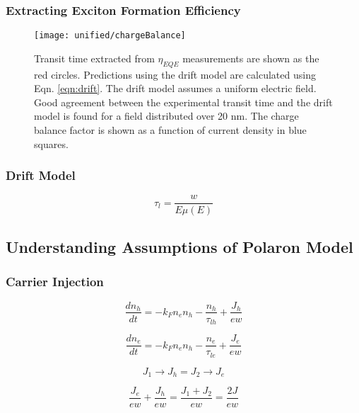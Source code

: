 \documentclass[../thesis.tex]{subfiles}
\begin{document}
\subsubsection{Extracting Exciton Formation Efficiency}
\begin{figure}[ht]
\centering
\texttt{[image: unified/chargeBalance]}
\caption{Transit time extracted from $\eta_{EQE}$ measurements are shown as the red circles. Predictions using the drift model are calculated using Eqn. \ref{eqn:drift}. The drift model assumes a uniform electric field. Good agreement between the experimental transit time and the drift model is found for a field distributed over 20 nm. The charge balance factor is shown as a function of current density in blue squares.}
\label{fig:chargeBalance}
\end{figure}
\subsubsection{Drift Model}

\begin{equation}
\tau_l=\frac{w}{E\mu(E)}
\label{eqn:drift}
\end{equation}


\subsection{Understanding Assumptions of Polaron Model}
\subsubsection{Carrier Injection}

\begin{equation}
\frac{dn_h}{dt}=-k_Fn_en_h-\frac{n_h}{\tau_{lh}}+\frac{J_h}{ew}
\label{eqn:hole_rate}
\end{equation}

\begin{equation}
\frac{dn_e}{dt}=-k_Fn_en_h-\frac{n_e}{\tau_{le}}+\frac{J_e}{ew}
\label{eqn:electron_rate}
\end{equation}

\begin{equation}
J_1\rightarrow J_h = J_2 \rightarrow J_e
\label{eqn:current_no_leakage}
\end{equation}

\begin{equation}
\frac{J_e}{ew}+\frac{J_h}{ew}=\frac{J_1+J_2}{ew}=\frac{2J}{ew}
\label{eqn:injected_polarons_no_leakage}
\end{equation}
\end{document}
